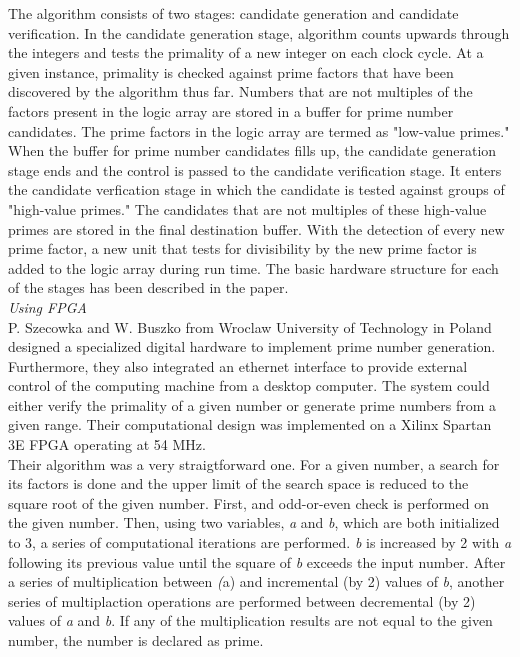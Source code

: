 \documentclass[journal]{IEEEtran}
\begin{document}
The algorithm consists of two stages: candidate generation and candidate verification. In the candidate generation stage, algorithm counts upwards through the integers and tests the primality of a new integer on each clock cycle. At a given instance, primality is checked against prime factors that have been discovered by the algorithm thus far. Numbers that are not multiples of the factors present in the logic array are stored in a buffer for prime number candidates. The prime factors in the logic array are termed as "low-value primes." When the buffer for prime number candidates fills up, the candidate generation stage ends and the control is passed to the candidate verification stage. It enters the candidate verfication stage in which the candidate is tested against groups of "high-value primes." The candidates that are not multiples of these high-value primes are stored in the final destination buffer. With the detection of every new prime factor, a new unit that tests for divisibility by the new prime factor is added to the logic array during run time. The basic hardware structure for each of the stages has been described in the paper. \\

\textit{Using FPGA}\\
P. Szecowka and W. Buszko from Wroclaw University of Technology in Poland designed a specialized digital hardware to implement prime number generation. Furthermore, they also integrated an ethernet interface to provide external control of the computing machine from a desktop computer. The system could either verify the primality of a given number or generate prime numbers from a given range. Their computational design was implemented on a Xilinx Spartan 3E FPGA operating at 54 MHz. \\

Their algorithm was a very straigtforward one. For a given number, a search for its factors is done and the upper limit of the search space is reduced to the square root of the given number. First, and odd-or-even check is performed on the given number. Then, using two variables, \textit{a} and \textit{b}, which are both initialized to 3, a series of computational iterations are performed. \textit{b} is increased by 2 with \textit{a} following its previous value until the square of \textit{b} exceeds the input number. After a series of multiplication between \textit(a) and incremental (by 2) values of \textit{b}, another series of multiplaction operations are performed between decremental (by 2) values of \textit{a} and \textit{b}. If any of the multiplication results are not equal to the given number, the number is declared as prime\cite{polandPrime}. \\
\end{document}
